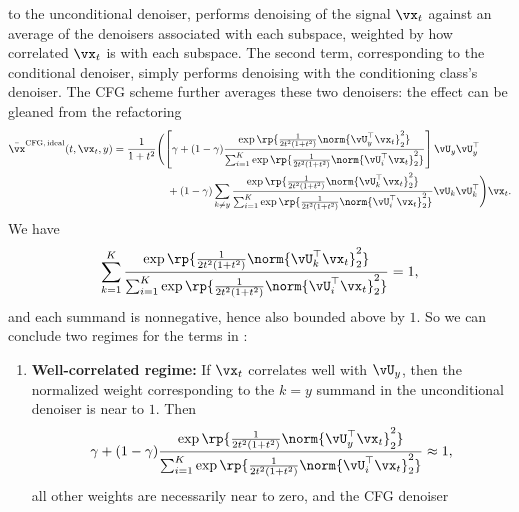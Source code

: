 \documentclass[../../book-main.tex]{subfiles}
\begin{document}
\begin{example}
  to the unconditional denoiser, performs denoising of the signal $\vx_t$
  against an average of the denoisers associated with each subspace, weighted by
  how correlated $\vx_t$ is with each subspace. The second term, corresponding to
  the conditional denoiser, simply performs denoising with the conditioning
  class's denoiser. The CFG scheme further averages these two denoisers:
  the effect can be gleaned from the refactoring
  \begin{equation}\label{eq:cfg-denoiser-mog-low-rank-2}
    \begin{split}
      \bar{\vx}^{\mathrm{CFG,\,ideal}}(t, \vx_t, y)
      =
      \frac{1}{1 + t^{2}}
      &\Biggl(
      \left[\gamma + (1 - \gamma) 
      \frac{\exp\rp{\frac{1}{2t^{2}(1
      + t^{2})}\norm{\vU_{y}^{\top}\vx_t}_{2}^{2}}}{\sum_{i
      = 1}^{K}\exp\rp{\frac{1}{2t^{2}(1
      + t^{2})}\norm{\vU_{i}^{\top}\vx_t}_{2}^{2}}}
      \right]
      \vU_{y}\vU_{y}^{\top}
      \\
      &\quad+
      (1 - \gamma) 
      \sum_{k \neq y}\frac{\exp\rp{\frac{1}{2t^{2}(1
      + t^{2})}\norm{\vU_{k}^{\top}\vx_t}_{2}^{2}}}{\sum_{i
      = 1}^{K}\exp\rp{\frac{1}{2t^{2}(1
      + t^{2})}\norm{\vU_{i}^{\top}\vx_t}_{2}^{2}}}\vU_{k}\vU_{k}^{\top}
      \Biggr)
      \vx_t.
    \end{split}
  \end{equation}
  We have
  \begin{equation}
    \sum_{k=1}^K
    \frac{\exp\rp{\frac{1}{2t^{2}(1
    + t^{2})}\norm{\vU_{k}^{\top}\vx_t}_{2}^{2}}}{\sum_{i
    = 1}^{K}\exp\rp{\frac{1}{2t^{2}(1
    + t^{2})}\norm{\vU_{i}^{\top}\vx_t}_{2}^{2}}}
    = 1,
  \end{equation}
  and each summand is nonnegative, hence also bounded above by $1$.
  So we can conclude two regimes for the terms in
  : 
  \begin{enumerate}
    \item \textbf{Well-correlated regime:} If $\vx_t$ correlates well with
      $\vU_y$, then the normalized weight corresponding to the $k=y$ summand in
      the unconditional denoiser is near to $1$. 
      Then 
      \begin{equation}
        \gamma + (1 - \gamma) 
      \frac{\exp\rp{\frac{1}{2t^{2}(1
      + t^{2})}\norm{\vU_{y}^{\top}\vx_t}_{2}^{2}}}{\sum_{i
      = 1}^{K}\exp\rp{\frac{1}{2t^{2}(1
      + t^{2})}\norm{\vU_{i}^{\top}\vx_t}_{2}^{2}}}
        \approx 1,
      \end{equation}
      all other weights are necessarily near to zero, and the CFG denoiser

\end{enumerate}
\end{example}
\end{document}
